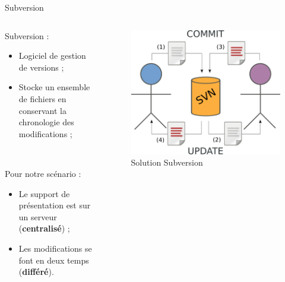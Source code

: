 \begin{frame}{Subversion}
\begin{columns}
  \begin{column}{.5\textwidth}
  Subversion :
  \begin{itemize}
    \item Logiciel de gestion de versions ;
    \item Stocke un ensemble de fichiers en conservant la chronologie des
    modifications ;
  \end{itemize}~

  Pour notre scénario :
  \begin{itemize}
    \item Le support de présentation est sur un serveur (\textbf{centralisé}) ;
    \item Les modifications se font en deux temps (\textbf{différé}).
  \end{itemize}
  \end{column}

  \begin{column}{.45\textwidth}
  \begin{figure}
    \center
    \includegraphics[width=.9\textwidth]{includes/svn.pdf}
    \caption{Solution Subversion}
  \end{figure}
  \end{column}
\end{columns}
\end{frame}

